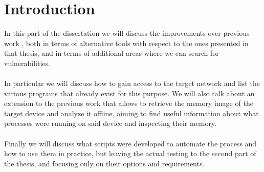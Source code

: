 \chapter{Introduction}
In this part of the dissertation we will discuss the improvements over
previous work \cite{previouswork}, both in terms of alternative tools
with respect to the ones presented in that thesis, and in terms of additional
areas where we can search for vulnerabilities.\\\\
In particular we will discuss how to gain access to the target network and list the
various programs that already exist for this purpose. We will also talk about
an extension to the previous work that allows to retrieve the memory image
of the target device and analyze it offline, aiming to find useful information
about what processes were running on said device and inspecting their memory.\\\\
Finally we will discuss what scripts were developed to automate the process
and how to use them in practice, but leaving the actual testing to the second part
of the thesis, and focusing only on their options and requirements.\\\\
